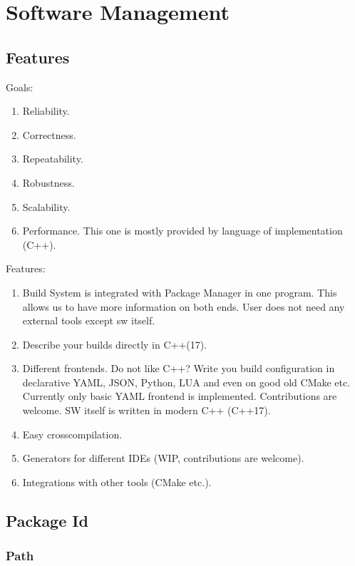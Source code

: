 

\chapter{Software Management}

\section{Features}

Goals:

\begin{enumerate}
\item
Reliability.
\item
Correctness.
\item
Repeatability.
\item
Robustness.
\item
Scalability.
\item
Performance. This one is mostly provided by language of implementation (C++).
\end{enumerate}

Features:

\begin{enumerate}
\item
Build System is integrated with Package Manager in one program. This allows us to have more information on both ends. User does not need any external tools except sw itself.
\item
Describe your builds directly in C++(17).
\item
Different frontends. Do not like C++? Write you build configuration in declarative YAML, JSON, Python, LUA and even on good old CMake etc. Currently only basic YAML frontend is implemented. Contributions are welcome.
SW itself is written in modern C++ (C++17).
\item
Easy crosscompilation.
\item
Generators for different IDEs (WIP, contributions are welcome).
\item
Integrations with other tools (CMake etc.).
\end{enumerate}






\section{Package Id}

\subsection{Path}

